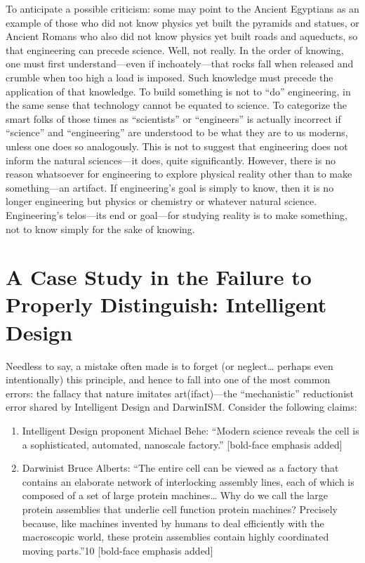 To anticipate a possible criticism: some may point to the Ancient Egyptians as an example of those who did not know physics yet built the pyramids and statues, or Ancient Romans who also did not know physics yet built roads and aqueducts, so that engineering can precede science. Well, not really. In the order of knowing, one must first understand—even if inchoately—that rocks fall when released and crumble when too high a load is imposed. Such knowledge must precede the application of that knowledge. To build something is not to “do” engineering, in the same sense that technology cannot be equated to science. To categorize the smart folks of those times as “scientists” or “engineers” is actually incorrect if “science” and “engineering” are understood to be what they are to us moderns, unless one does so analogously. This is not to suggest that engineering does not inform the natural sciences—it does, quite significantly. However, there is no reason whatsoever for engineering to explore physical reality other than to make something—an artifact. If engineering’s goal is simply to know, then it is no longer engineering but physics or chemistry or whatever natural science. Engineering’s telos—its end or goal—for studying reality is to make something, not to know simply for the sake of knowing.

\section{A Case Study in the Failure to Properly Distinguish: Intelligent Design}

Needless to say, a mistake often made is to forget (or neglect… perhaps even intentionally) this principle, and hence to fall into one of the most common errors: the fallacy that nature imitates art(ifact)—the “mechanistic” reductionist error shared by Intelligent Design and DarwinISM. Consider the following claims:

\begin{enumerate}
\item Intelligent Design proponent Michael Behe: “Modern science reveals the cell is a sophisticated, automated, nanoscale factory.”\cite{beheinterview} [bold-face emphasis added]
\item Darwinist Bruce Alberts: “The entire cell can be viewed as a factory that contains an elaborate network of interlocking assembly lines, each of which is composed of a set of large protein machines… Why do we call the large protein assemblies that underlie cell function protein machines? Precisely because, like machines invented by humans to deal efficiently with the macroscopic world, these protein assemblies contain highly coordinated moving parts.”10 [bold-face emphasis added]
\end{enumerate}

